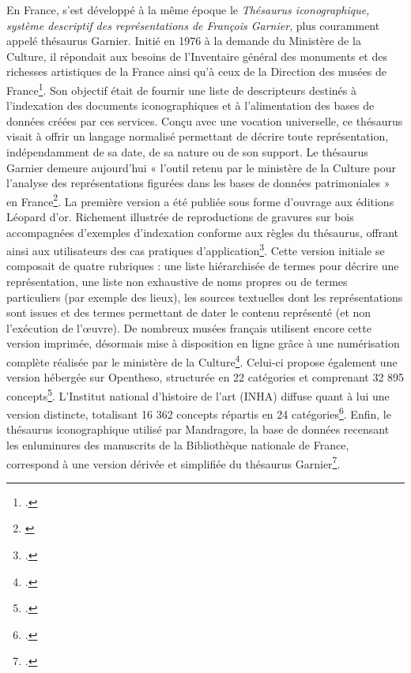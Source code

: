 En France, s’est développé à la même époque le \textit{Thésaurus iconographique, système descriptif des représentations de François Garnier}, plus couramment appelé thésaurus Garnier. Initié en 1976 à la demande du Ministère de la Culture, il répondait aux besoins de l’Inventaire général des monuments et des richesses artistiques de la France ainsi qu’à ceux de la Direction des musées de France\footcite[p. 11]{garnierThesaurusIconographiqueSysteme1984}. Son objectif était de fournir une liste de descripteurs destinés à l’indexation des documents iconographiques et à l’alimentation des bases de données créées par ces services. Conçu avec une vocation universelle, ce thésaurus visait à offrir un langage normalisé permettant de décrire toute représentation, indépendamment de sa date, de sa nature ou de son support. Le thésaurus Garnier demeure aujourd’hui « l'outil retenu par le ministère de la Culture pour l'analyse des représentations figurées dans les bases de données patrimoniales » en France\footnote{\cite{ministeredelacultureThesaurusIconographiqueSysteme2020}}. La première version a été publiée sous forme d’ouvrage aux éditions Léopard d’or. Richement illustrée de reproductions de gravures sur bois accompagnées d’exemples d’indexation conforme aux règles du thésaurus, offrant ainsi aux utilisateurs des cas pratiques d’application\footcite{garnierThesaurusIconographiqueSysteme1984}. Cette version initiale se composait de quatre rubriques : une liste hiérarchisée de termes pour décrire une représentation, une liste non exhaustive de noms propres ou de termes particuliers (par exemple des lieux), les sources textuelles dont les représentations sont issues et des termes permettant de dater le contenu représenté (et non l’exécution de l’œuvre). De nombreux musées français utilisent encore cette version imprimée, désormais mise à disposition en ligne grâce à une numérisation complète réalisée par le ministère de la Culture\footcite{ministeredelacultureThesaurusIconographiqueSysteme2020}. Celui-ci propose également une version hébergée sur Opentheso, structurée en 22 catégories et comprenant 32 895 concepts\footcite{ministeredelacultureThesaurusIconographiqueGarnier}. L’Institut national d’histoire de l’art (INHA) diffuse quant à lui une version distincte, totalisant 16 362 concepts répartis en 24 catégories\footcite{institutnationaldhistoiredelartThesaurusAGORHAGarnier2021}. Enfin, le thésaurus iconographique utilisé par Mandragore, la base de données recensant les enluminures des manuscrits de la Bibliothèque nationale de France, correspond à une version dérivée et simplifiée du thésaurus Garnier\footcite{bibliothequenationaledefranceThesaurusIconographiqueMandragore2024}.

